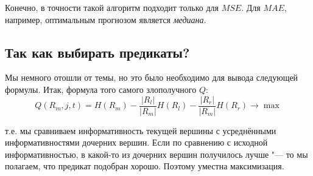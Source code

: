 Конечно, в точности такой алгоритм подходит только для $MSE$. Для $MAE$, например, оптимальным прогнозом является \textit{медиана}.

\subsection*{Так как выбирать предикаты?}
Мы немного отошли от темы, но это было необходимо для вывода следующей формулы. Итак, формула того самого злополучного $Q$:
\[
Q(R_m, j, t) = H(R_m) - \frac{|R_l|}{|R_m|}H(R_l) - \frac{|R_r|}{|R_m|}H(R_r) \rightarrow \max
\]

т.е. мы сравниваем информативность текущей вершины с усреднёнными информативностями дочерних вершин. Если по сравнению с исходной информативностью, в какой-то из дочерних вершин получилось лучше "--- то мы полагаем, что предикат подобран хорошо. Поэтому уместна максимизация.